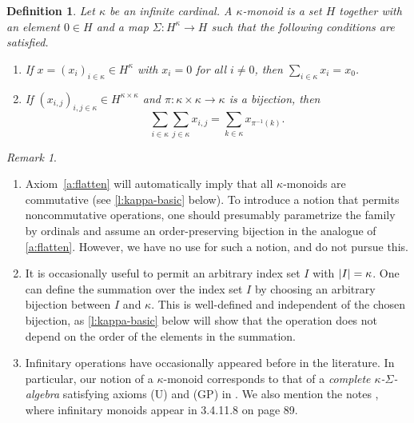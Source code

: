 \documentclass[a4paper,11pt,oneside]{amsart}
\newtheorem{defi}[teor]{Definition}
\theoremstyle{remark}
\newtheorem{remark}[teor]{Remark}
\DeclarePairedDelimiter{\card}{\lvert}{\rvert}
\begin{document}
\begin{defi} \label{def:kappa-monoid}
  Let $\kappa$ be an infinite cardinal.
  A $\kappa$-monoid is a set $H$ together with an element $0 \in H$ and a map $\Sigma \colon H^{\kappa} \to H$ such that the following conditions are satisfied.
  \begin{enumerate}[label=\textup{(A\arabic*)},leftmargin=1.25cm]
  \item \label{a:trivial} If $x=(x_i)_{i \in \kappa} \in H^\kappa$ with $x_i=0$ for all $i \ne 0$, then $\sum_{i \in \kappa} x_i=x_0$.
  \item \label{a:flatten}
    If $(x_{i,j})_{i,j \in \kappa} \in H^{\kappa \times \kappa}$ and $\pi \colon \kappa \times \kappa \to \kappa$ is a bijection, then
    \[
      {\sum_{i \in \kappa}} {\sum_{j \in \kappa}} x_{i,j} = {\sum_{k \in \kappa}} x_{\pi^{-1}(k)}.
    \]
  \end{enumerate}
\end{defi}

\begin{remark}
  \begin{enumerate}
  \item Axiom~\ref{a:flatten} will automatically imply that all $\kappa$-monoids are commutative (see \cref{l:kappa-basic} below).
    To introduce a notion that permits noncommutative operations, one should presumably parametrize the family by ordinals and assume an order-preserving bijection in the analogue of \ref{a:flatten}.
    However, we have no use for such a notion, and do not pursue this.

  \item It is occasionally useful to permit an arbitrary index set $I$ with $\card{I}=\kappa$.
    One can define the summation over the index set $I$ by choosing an arbitrary bijection between $I$ and $\kappa$.
    This is well-defined and independent of the chosen bijection, as \cref{l:kappa-basic} below will show that the operation does not depend on the order of the elements in the summation.

    
  \item Infinitary operations have occasionally appeared before in the literature.
    In particular, our notion of a $\kappa$-monoid corresponds to that of a \emph{complete $\kappa$-$\Sigma$-algebra} satisfying axioms (U) and (GP) in \cite[Chapter IV.1]{HebischWeinert98}.
    We also mention the notes \cite{vocab}, where infinitary monoids appear in 3.4.11.8 on page 89.
  \end{enumerate}
\end{remark}
\end{document}
